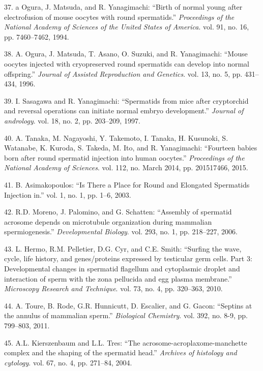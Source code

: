 \documentclass[12pt,a4paper,twoside]{ugathesis}
\theoremstyle{definition}
\theoremstyle{definition}
\theoremstyle{definition}
\theoremstyle{remark}
\begin{document}
\hypertarget{ref-Ogura1994}{}
37. a Ogura, J. Matsuda, and R. Yanagimachi: ``Birth of normal young
after electrofusion of mouse oocytes with round spermatids.''
\emph{Proceedings of the National Academy of Sciences of the United
States of America}. vol. 91, no. 16, pp. 7460--7462, 1994.

\hypertarget{ref-Kimura1995}{}
38. A. Ogura, J. Matsuda, T. Asano, O. Suzuki, and R. Yanagimachi:
``Mouse oocytes injected with cryopreserved round spermatids can develop
into normal offspring.'' \emph{Journal of Assisted Reproduction and
Genetics}. vol. 13, no. 5, pp. 431--434, 1996.

\hypertarget{ref-Sasagawa}{}
39. I. Sasagawa and R. Yanagimachi: ``Spermatids from mice after
cryptorchid and reversal operations can initiate normal embryo
development.'' \emph{Journal of andrology}. vol. 18, no. 2, pp.
203--209, 1997.

\hypertarget{ref-Tanaka2015}{}
40. A. Tanaka, M. Nagayoshi, Y. Takemoto, I. Tanaka, H. Kusunoki, S.
Watanabe, K. Kuroda, S. Takeda, M. Ito, and R. Yanagimachi: ``Fourteen
babies born after round spermatid injection into human oocytes.''
\emph{Proceedings of the National Academy of Sciences}. vol. 112, no.
March 2014, pp. 201517466, 2015.

\hypertarget{ref-Asimakopoulos2003}{}
41. B. Asimakopoulos: ``Is There a Place for Round and Elongated
Spermatids Injection in.'' vol. 1, no. 1, pp. 1--6, 2003.

\hypertarget{ref-Moreno2006}{}
42. R.D. Moreno, J. Palomino, and G. Schatten: ``Assembly of spermatid
acrosome depends on microtubule organization during mammalian
spermiogenesis.'' \emph{Developmental Biology}. vol. 293, no. 1, pp.
218--227, 2006.

\hypertarget{ref-Hermo2010}{}
43. L. Hermo, R.M. Pelletier, D.G. Cyr, and C.E. Smith: ``Surfing the
wave, cycle, life history, and genes/proteins expressed by testicular
germ cells. Part 3: Developmental changes in spermatid flagellum and
cytoplasmic droplet and interaction of sperm with the zona pellucida and
egg plasma membrane.'' \emph{Microscopy Research and Technique}. vol.
73, no. 4, pp. 320--363, 2010.

\hypertarget{ref-Toure2011}{}
44. A. Toure, B. Rode, G.R. Hunnicutt, D. Escalier, and G. Gacon:
``Septins at the annulus of mammalian sperm.'' \emph{Biological
Chemistry}. vol. 392, no. 8-9, pp. 799--803, 2011.

\hypertarget{ref-Kierszenbaum2004}{}
45. A.L. Kierszenbaum and L.L. Tres: ``The
acrosome-acroplaxome-manchette complex and the shaping of the spermatid
head.'' \emph{Archives of histology and cytology}. vol. 67, no. 4, pp.
271--84, 2004.
\end{document}
